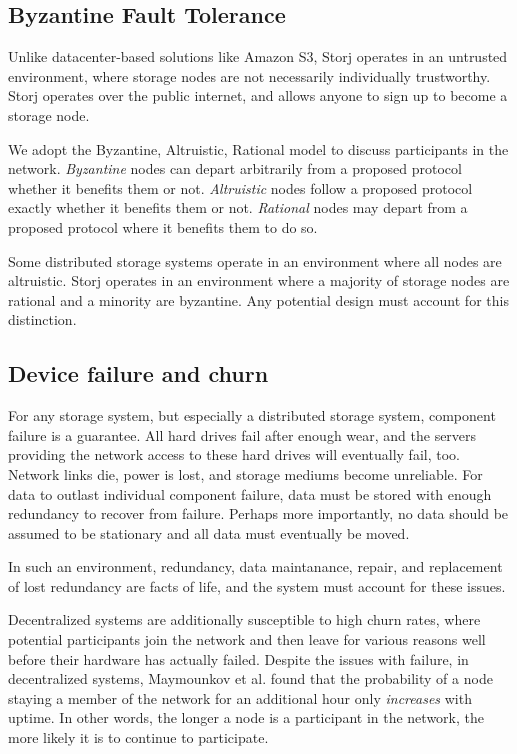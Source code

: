 \documentclass[a4paper,10pt]{article}
\begin{document}
\subsection{Byzantine Fault Tolerance}

Unlike datacenter-based solutions like Amazon S3, Storj operates in an
untrusted environment, where storage nodes are not necessarily
individually trustworthy. Storj operates over the public internet, and allows
anyone to sign up to become a storage node.

We adopt the Byzantine, Altruistic, Rational\cite{bar} model to discuss
participants in the network.
  {\em Byzantine} nodes can depart arbitrarily from a proposed protocol
    whether it benefits them or not.
  {\em Altruistic} nodes follow a proposed protocol exactly whether it
    benefits them or not.
  {\em Rational} nodes may depart from a proposed protocol where it benefits
    them to do so.

Some distributed storage systems operate in an environment where all nodes are
altruistic. Storj operates in an environment where a majority of storage
nodes are rational and a minority are byzantine. Any potential
design must account for this distinction.

\subsection{Device failure and churn}

For any storage system, but especially a distributed storage system, component
failure is a guarantee. All hard drives fail
after enough wear\cite{backblaze-hd-2018-q1}, and the servers providing
the network access to these hard drives will eventually fail, too. Network
links die, power is lost, and storage mediums become unreliable. For data
to outlast individual component failure, data must be stored with enough
redundancy to recover from failure. Perhaps more importantly, no data should be
assumed to be stationary and all data must eventually be moved.

In such an environment, redundancy, data maintanance, repair, and replacement
of lost redundancy are facts of life, and the system must account for these
issues.

Decentralized systems are additionally susceptible to high churn rates,
where potential participants join the network and then leave for various
reasons well before their hardware has actually failed. Despite the issues with
failure, in decentralized systems, Maymounkov et al. found that
the probability of a node staying a member of the network for an additional
hour only {\em increases} with uptime.\cite{kad} In other words, the
longer a node is a participant in the network, the more likely it is to
continue to participate.
\end{document}
